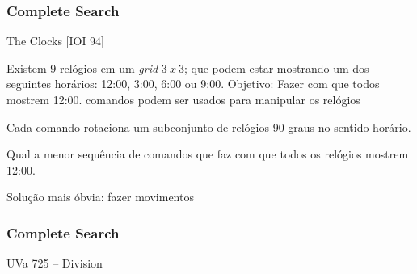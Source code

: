 \begin{frame}
\frametitle{Complete Search}
\begin{block}{The Clocks [IOI 94]}
\begin{itemize}
	\bitem Existem 9 relógios em um \emph{grid} $3\ x\ 3$; que podem estar mostrando um dos seguintes horários: 12:00, 3:00, 6:00 ou 9:00.
	\bitem Objetivo: Fazer com que todos mostrem 12:00.
	 comandos podem ser usados para manipular os relógios
	\begin{itemize}
		\bitem Cada comando rotaciona um subconjunto de relógios 90 graus no sentido horário. 
	\end{itemize}
	\bitem Qual a menor sequência de comandos que faz com que todos os relógios mostrem 12:00.
\end{itemize}
\end{block}
\pause
\begin{block}{}
\begin{itemize}
	\bitem Solução mais óbvia: fazer movimentos 
	\bitem 
\end{itemize}
\end{block}

%
%
%
%
\end{frame}

\begin{frame}
\frametitle{Complete Search}
\begin{block}{UVa 725 -- Division}
\end{block}
\end{frame}

